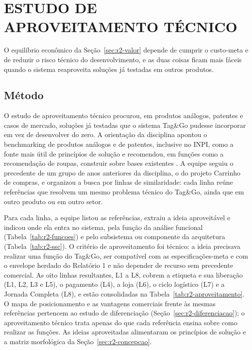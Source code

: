 
\section{ESTUDO DE APROVEITAMENTO TÉCNICO}
\label{sec:r2-aproveitamento}

O equilíbrio econômico da Seção~\ref{sec:r2-valor} depende de cumprir o custo-meta e de reduzir o risco técnico do desenvolvimento, e as duas coisas ficam mais fáceis quando o sistema reaproveita soluções já testadas em outros produtos.

\subsection{Método}
\label{sub:r2-aprov-metodo}

O estudo de aproveitamento técnico procurou, em produtos análogos, patentes e casos de mercado, soluções já testadas que o sistema Tag\&Go pudesse incorporar em vez de desenvolver do zero. A orientação da disciplina apontou o benchmarking de produtos análogos e de patentes, inclusive no INPI, como a fonte mais útil de princípios de solução e recomendou, em funções como a recomendação de roupas, construir sobre bases existentes \cite{zancul2026conceitual}. A equipe seguiu o precedente de um grupo de anos anteriores da disciplina, o do projeto Carrinho de compras, e organizou a busca por linhas de similaridade: cada linha reúne referências que resolvem um mesmo problema técnico do Tag\&Go, ainda que em outro produto ou em outro setor.

Para cada linha, a equipe listou as referências, extraiu a ideia aproveitável e indicou onde ela entra no sistema, pela função da análise funcional (Tabela~\ref{tab:r2-funcoes}) e pelo subsistema ou componente da arquitetura (Tabela~\ref{tab:r2-ssc}). O critério de aproveitamento foi técnico: a ideia precisava realizar uma função do Tag\&Go, ser compatível com as especificações-meta e com o envelope herdado do Relatório 1 e não depender de recurso sem precedente comercial. As oito linhas resultantes, L1 a L8, cobrem a etiqueta e sua liberação (L1, L2, L3 e L5), o pagamento (L4), a loja (L6), o ciclo logístico (L7) e a Jornada Completa (L8), e estão consolidadas na Tabela~\ref{tab:r2-aproveitamento}. O mapa de posicionamento e as vantagens comerciais frente às mesmas referências pertencem ao estudo de diferenciação (Seção~\ref{sec:r2-diferenciacao}); o aproveitamento técnico trata apenas do que cada referência ensina sobre como realizar as funções. As ideias aproveitadas alimentaram os princípios de solução e a matriz morfológica da Seção~\ref{sec:r2-concepcao}.

